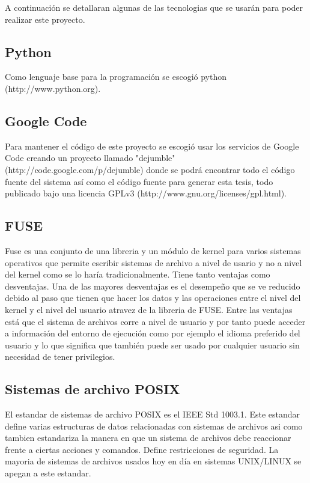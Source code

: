 A continuación se detallaran algunas de las tecnologias que se usarán para poder realizar este proyecto.

\subsection{Python}

Como lenguaje base para la programación se escogió python (http://www.python.org).

\subsection{Google Code}

Para mantener el código de este proyecto se escogió usar los servicios de Google Code creando un proyecto llamado "dejumble" (http://code.google.com/p/dejumble) donde se podrá encontrar todo el código fuente del sistema así como el código fuente para generar esta tesis, todo publicado bajo una licencia GPLv3 (http://www.gnu.org/licenses/gpl.html).

\subsection{FUSE}

Fuse es una conjunto de una libreria y un módulo de kernel para varios sistemas operativos que permite escribir sistemas de archivo a nivel de usario y no a nivel del kernel como se lo haría tradicionalmente. Tiene tanto ventajas como desventajas. Una de las mayores desventajas es el desempeño que se ve reducido debido al paso que tienen que hacer los datos y las operaciones entre el nivel del kernel y el nivel del usuario atravez de la libreria de FUSE. Entre las ventajas está que el sistema de archivos corre a nivel de usuario y por tanto puede acceder a información del entorno de ejecución como por ejemplo el idioma preferido del usuario y lo que significa que también puede ser usado por cualquier usuario sin necesidad de tener privilegios.

\subsection{Sistemas de archivo POSIX}

El estandar de sistemas de archivo POSIX es el IEEE Std 1003.1. Este estandar define varias estructuras de datos relacionadas con sistemas de archivos asi como tambien estandariza la manera en que un sistema de archivos debe reaccionar frente a ciertas acciones y comandos. Define restricciones de seguridad. La mayoria de sistemas de archivos usados hoy en día en sistemas UNIX/LINUX se apegan a este estandar.

